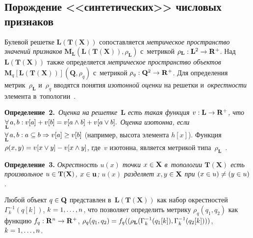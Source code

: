 \begin{multicols}{2}
\vspace*{-6pt}
     
\section{Порождение <<синтетических>> числовых признаков}

\vspace*{-2pt}

     Булевой решетке $\mathbf{L}(\mathbf{T}(\mathbf{X}))$ сопоставляется 
\textit{метрическое пространство значений признаков} 
$\mathbf{M}_{\mathbf{L}} (\mathbf{L}(\mathbf{T}(\mathbf{X})), 
\rho_{\mathbf{L}})$ с~метрикой $\rho_{\mathbf{L}}: \mathbf{L}^2\hm\to 
\mathbf{R}^+$. Над $\mathbf{L}(\mathbf{T}(\mathbf{X}))$ также 
определяется \textit{метрическое пространство объектов} $\mathbf{M}_q 
[\mathbf{L}(\mathbf{T}(\mathbf{X}))](\mathbf{Q},\rho_q)$ с~мет\-ри\-кой 
$\rho_q: \mathbf{Q}^2\hm\to \mathbf{R}^+$. Для определения 
метрик~$\rho_{\mathbf{L}}$ и~$\rho_q$ вводятся понятия \textit{изотонной 
оценки} на решетки и~\textit{окрест\-ности} элемента в~топологии~\cite{6-tr}.
     
     \smallskip
     
     \noindent
     \textbf{Определение~2.}\ \textit{Оценка на решетке~$\mathbf{L}$ есть 
такая функция $v: \mathbf{L}\hm\to \mathbf{R}^+$, что 
$\underset{\mathbf{L}}{\forall}\, a,b: v[a]\hm+v[b]\hm= v[a\wedge b]\hm+ v[a\vee b].
$
 Оценка изотонна, если} 
 $\underset{\mathbf{L}}{\forall}\, a,b: a\hm\subseteq 
b\hm\Rightarrow v[a]\hm\geq v[b]$ 
(например, высота элемента $h[x]$). Функция 
$\rho(x,y)\hm= v[x\vee y]\hm- v[x\wedge y]$, где~$v$ изотонна, является 
метрикой типа~$\rho_{\mathbf{L}}$~\cite{6-tr}.

\smallskip

\noindent
\textbf{Определение~3.} \textit{Окрестность $u(x)$ точки $x\hm\in 
\mathbf{X}$ в~топологии $\mathbf{T}(\mathbf{X})$ есть произвольное $u\hm\in 
\mathbf{T}(\mathbf{X})$, $x\hm\in \mathbf{u}$; $u(x)$ разделяет $x,y\hm\in 
\mathbf{X}$ при} $(x\hm\in {u})\not= (y\hm\in {u})$. 
     
     Любой объект $q\hm\in \mathbf{Q}$ представлен 
в~$\mathbf{L}(\mathbf{T}(\mathbf{X}))$ как набор окрестностей 
$\Gamma_k^{-1}(q[k])$, $k\hm=1, \ldots , n$, что позволяет определить метрику 
$\rho_q(q_1,q_2)$ как функцию $f_q: \mathbf{R}^n\hm\to \mathbf{R}^+$, 
$\rho_q(q_1,q_2)\hm= f_q((\rho_{\mathbf{L}}(\Gamma^{-1}_k (q_1[k]), 
\Gamma_k^{-1}(q_2[k])))$, $k\hm= 1, \ldots , n$. 


\end{multicols}
